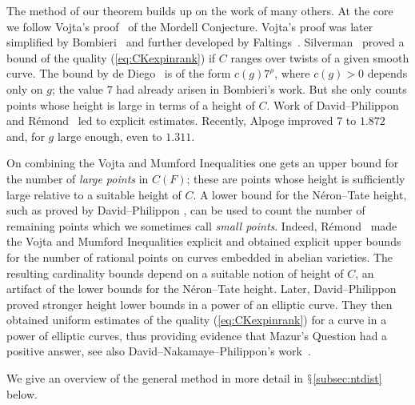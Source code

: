 The method of our theorem builds up on the work of many others. At the
core we follow Vojta's proof~\cite{Vojta:siegelcompact} of the
Mordell Conjecture.
Vojta's proof was later simplified  by
Bombieri~\cite{Bombieri:Mordell} and further developed by
Faltings~\cite{Faltings:DAAV}. Silverman~\cite{Silverman:twists}
proved a bound of the quality (\ref{eq:CKexpinrank}) if $C$ ranges
over twists of a given smooth curve.
The bound by de
Diego~\cite{deDiego:97} %
is of the form $c(g)
7^{\rho}$, where $c(g)>0$ depends only on $g$; the value $7$ had already
arisen in Bombieri's work. But she only counts points
whose height is large in terms of a height of $C$.
Work of David--Philippon \cite{DPvarabII} and R\'emond~\cite{Remond:Decompte}
led to explicit estimates.
Recently, Alpoge \cite{AlpogeRatPt} \cite[Theorem~6.1.1]{AlpogeThesis} improved  $7$
to $1.872$ and, for $g$ large enough, even to $1.311$.

On combining the Vojta and Mumford Inequalities
one gets an upper bound for the number of \textit{large points} in
$C(F)$; these are points whose height is sufficiently large relative
to a suitable height of $C$. A lower bound for the N\'eron--Tate
height, such as proved by David--Philippon \cite{DPvarabII}, can be used to
count the number of remaining points which we sometimes call
\textit{small points}.
Indeed, R\'emond~\cite{Remond:Decompte} made the Vojta and Mumford
Inequalities explicit and obtained
explicit upper bounds for the number of rational points on curves
embedded in abelian varieties.
The resulting cardinality bounds
depend on a suitable notion of height of $C$, an artifact of the lower
bounds for the N\'eron--Tate height.
Later, David--Philippon~\cite{DaPh:07} proved stronger height lower
bounds
in a power of an
elliptic curve. They then
 obtained uniform estimates
of the quality (\ref{eq:CKexpinrank}) for a curve in a power of
elliptic curves,  thus providing evidence that Mazur's Question had a
positive answer, see also
David--Nakamaye--Philippon's work~\cite{DaNaPh:07}.

We give an overview of the general method  in more detail in
$\mathsection$\ref{subsec:ntdist} below.

